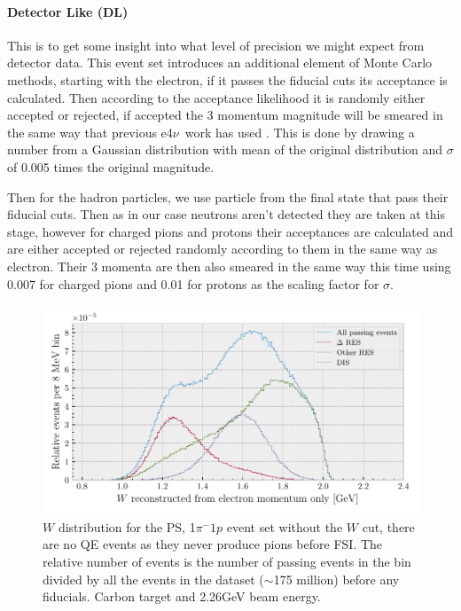 \documentclass[a4paper,12pt]{article}
\newcommand{\efn}{e4$\nu$}
\begin{document}
\paragraph{Detector Like (DL)} This is to get some insight into what level of precision we might expect from detector data.
This event set introduces an additional element of Monte Carlo methods, starting with the electron, if it passes the fiducial cuts its acceptance is calculated.
Then according to the acceptance likelihood it is randomly either accepted or rejected, if accepted the 3 momentum magnitude will be smeared in the same way that previous \efn\ work has used \cite{papadopoulouLeptonNucleusScatteringMeasurements2023}.
This is done by drawing a number from a Gaussian distribution with mean of the original distribution and $\sigma$ of 0.005 times the original magnitude.

Then for the hadron particles, we use particle from the final state that pass their fiducial cuts.
Then as in our case neutrons aren't detected they are taken at this stage, however for charged pions and protons their acceptances are calculated and are either accepted or rejected randomly according to them in the same way as electron.
Their 3 momenta are then also smeared in the same way this time using 0.007 for charged pions and 0.01 for protons as the scaling factor for $\sigma$.

\begin{figure}[H]
    \centering
    \includegraphics{figures/python/W_demo.pdf}
    \caption{
        $W$ distribution for the PS, 1$\pi^-1p$ event set without the $W$ cut, there are no QE events as they never produce pions before FSI.
        The relative number of events is the number of passing events in the bin divided by all the events in the dataset ($\sim$175 million) before any fiducials.
        Carbon target and 2.26\si{GeV} beam energy.
    }\label{fig:W_demo}
\end{figure}
\end{document}
